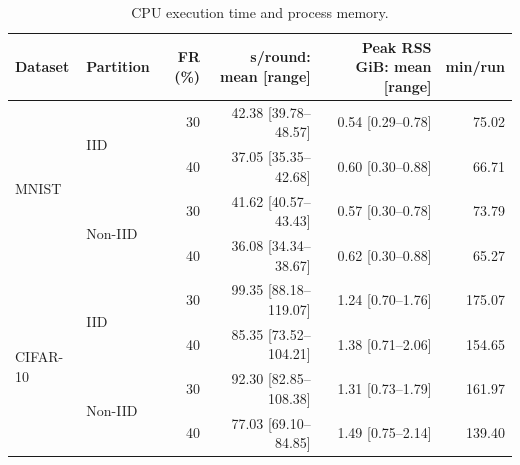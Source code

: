 \begin{table}[t]
\centering\footnotesize\setlength{\tabcolsep}{4pt}
\caption{CPU execution time and process memory.}\label{tab:cost}
\begin{tabular}{llrrrr}
\toprule
Dataset & Partition & FR (\%) & s/round: mean [range] & Peak RSS GiB: mean [range] & min/run \\
\midrule
\multirow{4}{*}{MNIST} & \multirow{2}{*}{IID} & 30 & 42.38 [39.78--48.57] & 0.54 [0.29--0.78] & 75.02 \\
 &  & 40 & 37.05 [35.35--42.68] & 0.60 [0.30--0.88] & 66.71 \\
 & \multirow{2}{*}{Non-IID} & 30 & 41.62 [40.57--43.43] & 0.57 [0.30--0.78] & 73.79 \\
 &  & 40 & 36.08 [34.34--38.67] & 0.62 [0.30--0.88] & 65.27 \\
\midrule
\multirow{4}{*}{CIFAR-10} & \multirow{2}{*}{IID} & 30 & 99.35 [88.18--119.07] & 1.24 [0.70--1.76] & 175.07 \\
 &  & 40 & 85.35 [73.52--104.21] & 1.38 [0.71--2.06] & 154.65 \\
 & \multirow{2}{*}{Non-IID} & 30 & 92.30 [82.85--108.38] & 1.31 [0.73--1.79] & 161.97 \\
 &  & 40 & 77.03 [69.10--84.85] & 1.49 [0.75--2.14] & 139.40 \\
\bottomrule
\end{tabular}
\end{table}
